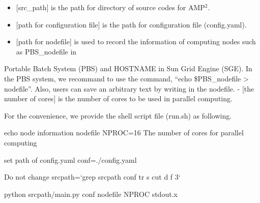 \documentclass[letterpaper,10pt,english]{sphinxmanual}
\begin{document}
\begin{sphinxVerbatim}[commandchars=\\\{\}]
 \PYG{p}{[}\PYG{p}{]} \PYG{p}{[}   \PYG{p}{]} \PYG{p}{[}  \PYG{p}{]} \PYG{p}{[}   \PYG{p}{]}
\end{sphinxVerbatim}
\begin{itemize}
\item {} 
{[}src\_path{]} is the path for directory of source codes for AMP$^{\text{2}}$.

\item {} 
{[}path for configuration file{]} is the path for configuration file (config.yaml).

\item {} 
{[}path for nodefile{]} is used to record the information of computing nodes such as PBS\_nodefile in

\end{itemize}

Portable Batch System (PBS) and HOSTNAME in Sun Grid Engine (SGE). In the PBS system, we recommand to use
the command, “echo \$PBS\_nodefile \textgreater{} nodefile”. Also, users can save an arbitrary text
by writing in the nodefile.
- {[}the number of cores{]} is the number of cores to be used in parallel computing.

For the convenience, we provide the shell script file (run.sh) as following.

\begin{sphinxVerbatim}[commandchars=\\\{\}]
echo \PYGZsq{}node information\PYGZsq{} \PYGZgt{} nodefile
NPROC=16       \PYGZsh{} The number of cores for parallel computing

\PYGZsh{}\PYGZsh{}\PYGZsh{} set path of config.yaml \PYGZsh{}\PYGZsh{}\PYGZsh{}
conf=./config.yaml
\PYGZsh{}\PYGZsh{}\PYGZsh{}\PYGZsh{}\PYGZsh{}\PYGZsh{}\PYGZsh{}\PYGZsh{}\PYGZsh{}\PYGZsh{}\PYGZsh{}\PYGZsh{}\PYGZsh{}\PYGZsh{}\PYGZsh{}\PYGZsh{}\PYGZsh{}\PYGZsh{}\PYGZsh{}\PYGZsh{}\PYGZsh{}\PYGZsh{}\PYGZsh{}\PYGZsh{}\PYGZsh{}\PYGZsh{}\PYGZsh{}\PYGZsh{}\PYGZsh{}\PYGZsh{}\PYGZsh{}

\PYGZsh{}\PYGZsh{}\PYGZsh{} Do not change \PYGZsh{}\PYGZsh{}\PYGZsh{}\PYGZsh{}\PYGZsh{}\PYGZsh{}\PYGZsh{}\PYGZsh{}\PYGZsh{}\PYGZsh{}\PYGZsh{}\PYGZsh{}\PYGZsh{}
src\PYGZus{}path={}`grep \PYGZsq{}src\PYGZus{}path\PYGZsq{} \PYGZdl{}conf \textbar{} tr \PYGZhy{}s \PYGZsq{} \PYGZsq{} \textbar{} cut \PYGZhy{}d \PYGZdq{} \PYGZdq{} \PYGZhy{}f 3{}`
\PYGZsh{}\PYGZsh{}\PYGZsh{}\PYGZsh{}\PYGZsh{}\PYGZsh{}\PYGZsh{}\PYGZsh{}\PYGZsh{}\PYGZsh{}\PYGZsh{}\PYGZsh{}\PYGZsh{}\PYGZsh{}\PYGZsh{}\PYGZsh{}\PYGZsh{}\PYGZsh{}\PYGZsh{}\PYGZsh{}\PYGZsh{}\PYGZsh{}\PYGZsh{}\PYGZsh{}\PYGZsh{}\PYGZsh{}\PYGZsh{}\PYGZsh{}\PYGZsh{}\PYGZsh{}\PYGZsh{}

python \PYGZdl{}src\PYGZus{}path/main.py \PYGZdl{}conf nodefile \PYGZdl{}NPROC \PYGZgt{}\PYGZam{} stdout.x
\end{sphinxVerbatim}
\end{document}
